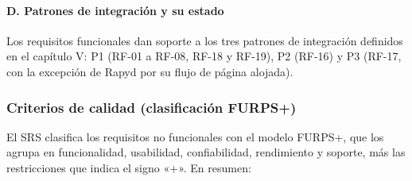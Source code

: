 \paragraph{D. Patrones de integración y su estado}
Los requisitos funcionales dan soporte a los tres patrones de integración definidos en el capítulo V: P1 (RF-01 a RF-08, RF-18 y RF-19), P2 (RF-16) y P3 (RF-17, con la excepción de Rapyd por su flujo de página alojada).

\subsubsection{Criterios de calidad (clasificación FURPS+)}
El SRS clasifica los requisitos no funcionales con el modelo FURPS+, que los agrupa en funcionalidad, usabilidad, confiabilidad, rendimiento y soporte, más las restricciones que indica el signo «+». En resumen:
